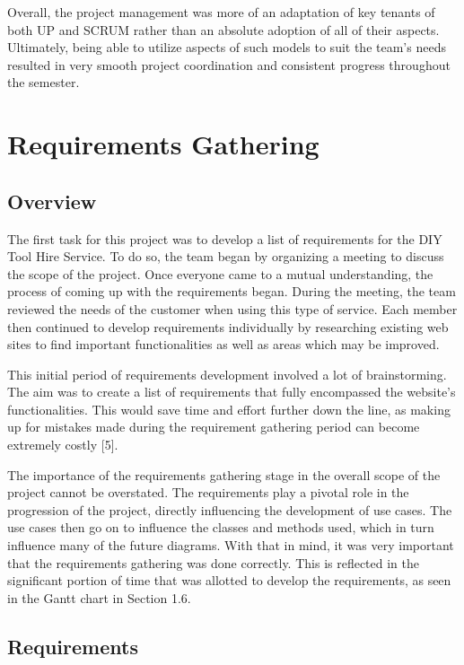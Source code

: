 \documentclass[fontsize=11pt]{extarticle}
\numberwithin{figure}{section} %
\numberwithin{table}{section}%
\begin{document}
Overall, the project management was more of an adaptation of key tenants
of both UP and SCRUM rather than an absolute adoption of all of their
aspects. Ultimately, being able to utilize aspects of such models to
suit the team's needs resulted in very smooth project coordination and
consistent progress throughout the semester.

\newpage

\hypertarget{requirements-gathering}{%
\section{Requirements Gathering}\label{requirements-gathering}}

\hypertarget{overview}{%
\subsection{Overview}\label{overview}}

The first task for this project was to develop a list of requirements
for the DIY Tool Hire Service. To do so, the team began by organizing a
meeting to discuss the scope of the project. Once everyone came to a
mutual understanding, the process of coming up with the requirements
began. During the meeting, the team reviewed the needs of the customer
when using this type of service. Each member then continued to develop
requirements individually by researching existing web sites to find
important functionalities as well as areas which may be improved.

This initial period of requirements development involved a lot of
brainstorming. The aim was to create a list of requirements that fully
encompassed the website's functionalities. This would save time and
effort further down the line, as making up for mistakes made during the
requirement gathering period can become extremely costly {[}5{]}.

The importance of the requirements gathering stage in the overall scope
of the project cannot be overstated. The requirements play a pivotal
role in the progression of the project, directly influencing the
development of use cases. The use cases then go on to influence the
classes and methods used, which in turn influence many of the future
diagrams. With that in mind, it was very important that the requirements
gathering was done correctly. This is reflected in the significant
portion of time that was allotted to develop the requirements, as seen
in the Gantt chart in Section 1.6.

\hypertarget{requirements}{%
\subsection{Requirements}\label{requirements}}
\end{document}
